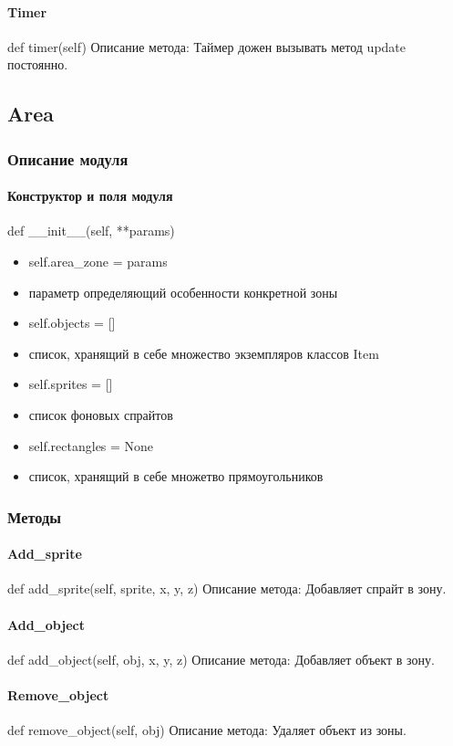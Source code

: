 \paragraph{Timer}
def timer(self)
Описание метода: Таймер дожен вызывать метод update постоянно.


\subsection{Area}
\subsubsection{Описание модуля}
\paragraph{Конструктор и поля модуля}
def \_\_init\_\_(self, **params)
\begin{itemize}
	\item self.area\_zone = params 
	\item параметр определяющий особенности конкретной зоны
	\item self.objects = [] 
	\item список, хранящий в себе множество экземпляров классов Item
	\item self.sprites = [] 
	\item список фоновых спрайтов
	\item self.rectangles = None 
	\item список, хранящий в себе множетво прямоугольников
\end{itemize}
\subsubsection{Методы}
\paragraph{Add\_sprite}
def add\_sprite(self, sprite, x, y, z)
Описание метода: Добавляет спрайт в зону.
\paragraph{Add\_object}
def add\_object(self, obj, x, y, z)
Описание метода: Добавляет объект в зону.
\paragraph{Remove\_object}
def remove\_object(self, obj)
Описание метода: Удаляет объект из зоны.
